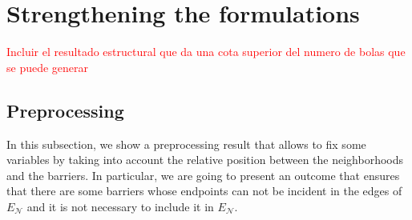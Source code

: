 \documentclass[a4paper]{elsarticle}
\newcommand{\EN}{{E^{}_{\mathcal N}}}
\begin{document}
%
%
%

\section{Strengthening the formulations}\label{section:strengthening}
\textcolor{red}{Incluir el resultado estructural que da una cota superior del numero de bolas que se puede generar}
\subsection{Preprocessing}\label{subsection:preprocessing}
In this subsection, we show a preprocessing result that allows to fix some variables by taking into account the relative position between the neighborhoods and the barriers.
In particular, we are going to present an outcome that ensures that there are some barriers whose endpoints can not be incident in the edges of $\EN$ and it is not necessary to include it in $\EN$. 
\end{document}
